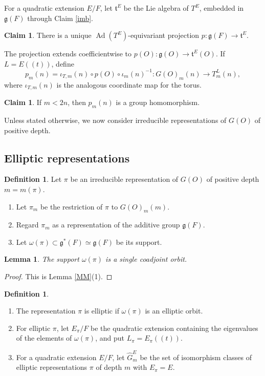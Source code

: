 \documentclass[11pt,a4paper,twoside]{amsart}
\newtheorem{lemma}[theorem]{Lemma}
\theoremstyle{definition}
\newtheorem{definition}[theorem]{Definition}
\newtheorem{claim}[theorem]{Claim}
\theoremstyle{remark}
\newcommand{\bo}{\omega}
\newcommand{\fg}{\mathfrak g}
\newcommand{\ft}{\mathfrak t}
\newcommand{\Ad}{\operatorname{Ad}}
\begin{document}
For a quadratic extension $E/F$, let $\ft^E$ be the Lie algebra of $T^E$, embedded in $\fg(F)$ through Claim \ref{imb}.
\begin{claim}\label{pro}
There is a unique $\Ad(T^E)$-equivariant projection $p:\fg(F)\to\ft^E$.
\end{claim}
The projection extends coefficientwise to $p(O):\fg(O)\to\ft^E(O)$. If $L=E((t))$, define
$$
p_m(n)=\iota_{T,m}(n)\circ p(O)\circ\iota_m(n)^{-1}:G(O)_m(n)\longrightarrow T^L_m(n),
$$
where $\iota_{T,m}(n)$ is the analogous coordinate map for the torus.
\begin{claim}\label{iota}
If $m<2n$, then $p_m(n)$ is a group homomorphism.
\end{claim}
Unless stated otherwise, we now consider irreducible representations of $G(O)$ of positive depth.
\subsection{Elliptic representations}
\begin{definition}\label{def}
Let $\pi$ be an irreducible representation of $G(O)$ of positive depth $m=m(\pi)$.
\begin{enumerate}
\item Let $\pi_m$ be the restriction of $\pi$ to $G(O)_m(m)$.
\item Regard $\pi_m$ as a representation of the additive group $\fg(F)$.
\item Let $\bo(\pi)\subset\fg^*(F)\simeq\fg(F)$ be its support.
\end{enumerate}
\end{definition}
\begin{lemma}\label{support}
The support $\bo(\pi)$ is a single coadjoint orbit.
\end{lemma}
\begin{proof}
This is Lemma \ref{MM}(1).
\end{proof}
\begin{definition}\label{def1}
\begin{enumerate}
\item The representation $\pi$ is elliptic if $\bo(\pi)$ is an elliptic orbit.
\item For elliptic $\pi$, let $E_\pi/F$ be the quadratic extension containing the eigenvalues of the elements of $\bo(\pi)$, and put $L_\pi=E_\pi((t))$.
\item For a quadratic extension $E/F$, let $\widehat G_m^E$ be the set of isomorphism classes of elliptic representations $\pi$ of depth $m$ with $E_\pi=E$.
\end{enumerate}
\end{definition}
\end{document}
